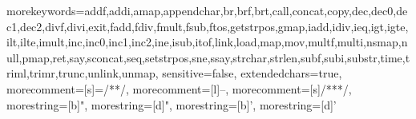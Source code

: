 {morekeywords={addf,addi,amap,appendchar,br,brf,brt,call,concat,copy,dec,dec0,dec1,dec2,divf,divi,exit,fadd,fdiv,fmult,fsub,ftos,getstrpos,gmap,iadd,idiv,ieq,igt,igte,ilt,ilte,imult,inc,inc0,inc1,inc2,ine,isub,itof,link,load,map,mov,multf,multi,nsmap,null,pmap,ret,say,sconcat,seq,setstrpos,sne,ssay,strchar,strlen,subf,subi,substr,time,triml,trimr,trunc,unlink,unmap},
sensitive=false,
extendedchars=true,
morecomment=[s]={/*}{*/},
morecomment=[l]{--},
morecomment=[s]{/**}{*/},
morestring=[b]",
morestring=[d]",
morestring=[b]',
morestring=[d]'}

